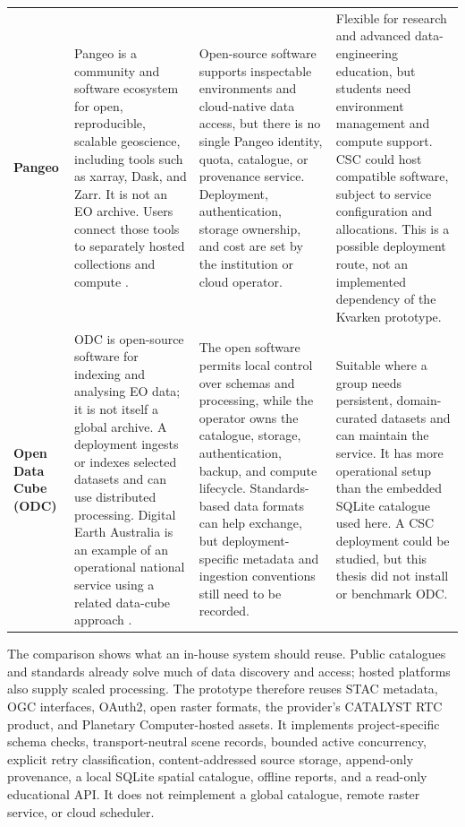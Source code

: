 \begin{longtable}{p{}p{}p{}p{}}
\textbf{Pangeo} &
Pangeo is a community and software ecosystem for open, reproducible, scalable geoscience,
including tools such as xarray, Dask, and Zarr. It is not an EO archive. Users connect those
tools to separately hosted collections and compute \citep{pangeo-paper,pangeo-home}. &
Open-source software supports inspectable environments and cloud-native data access, but
there is no single Pangeo identity, quota, catalogue, or provenance service. Deployment,
authentication, storage ownership, and cost are set by the institution or cloud operator. &
Flexible for research and advanced data-engineering education, but students need environment
management and compute support. CSC could host compatible software, subject to service
configuration and allocations. This is a possible deployment route, not an implemented
dependency of the Kvarken prototype. \\

\textbf{Open Data Cube (ODC)} &
ODC is open-source software for indexing and analysing EO data; it is not itself a global
archive. A deployment ingests or indexes selected datasets and can use distributed processing.
Digital Earth Australia is an example of an operational national service using a related
data-cube approach \citep{odc-home,dea-home}. &
The open software permits local control over schemas and processing, while the operator owns
the catalogue, storage, authentication, backup, and compute lifecycle. Standards-based data
formats can help exchange, but deployment-specific metadata and ingestion conventions still
need to be recorded. &
Suitable where a group needs persistent, domain-curated datasets and can maintain the
service. It has more operational setup than the embedded SQLite catalogue used here. A CSC
deployment could be studied, but this thesis did not install or benchmark ODC. \\
\end{longtable}
\normalsize

The comparison shows what an in-house system should reuse. Public catalogues and standards
already solve much of data discovery and access; hosted platforms also supply scaled processing.
The prototype therefore reuses STAC metadata, OGC interfaces, OAuth2, open raster formats,
the provider's CATALYST RTC product, and Planetary Computer-hosted assets. It implements
project-specific schema checks, transport-neutral scene records, bounded active concurrency,
explicit retry classification, content-addressed source storage, append-only provenance, a
local SQLite spatial catalogue, offline reports, and a read-only educational API. It does not
reimplement a global catalogue, remote raster service, or cloud scheduler.


